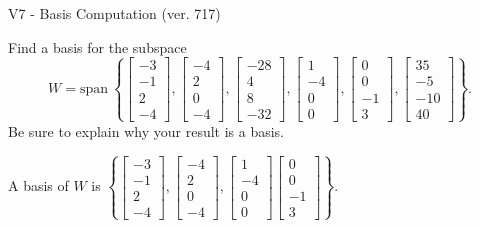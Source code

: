 \begin{exercise}
  \begin{exerciseTitle}V7 - Basis Computation (ver. 717)\end{exerciseTitle}
  \begin{exerciseStatement}
    Find a basis for the subspace 
\[W=\mathrm{span}\ \left\{\left[\begin{array}{r}
-3 \\
-1 \\
2 \\
-4
\end{array}\right] , \left[\begin{array}{r}
-4 \\
2 \\
0 \\
-4
\end{array}\right] , \left[\begin{array}{r}
-28 \\
4 \\
8 \\
-32
\end{array}\right] , \left[\begin{array}{r}
1 \\
-4 \\
0 \\
0
\end{array}\right] , \left[\begin{array}{r}
0 \\
0 \\
-1 \\
3
\end{array}\right] , \left[\begin{array}{r}
35 \\
-5 \\
-10 \\
40
\end{array}\right]\right\}.\]
 Be sure to explain why your result is a basis.


  \end{exerciseStatement}
  \begin{exerciseAnswer}
   A basis of \(W\) is  \(\left\{\left[\begin{array}{r}
-3 \\
-1 \\
2 \\
-4
\end{array}\right] , \left[\begin{array}{r}
-4 \\
2 \\
0 \\
-4
\end{array}\right] , \left[\begin{array}{r}
1 \\
-4 \\
0 \\
0
\end{array}\right] \left[\begin{array}{r}
0 \\
0 \\
-1 \\
3
\end{array}\right]\right\}\).
  


  \end{exerciseAnswer}
\end{exercise}